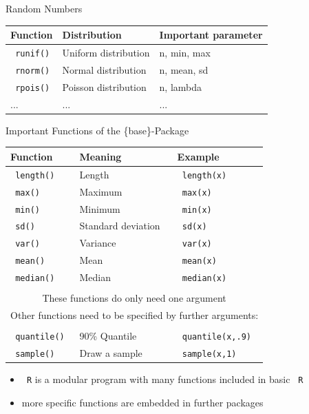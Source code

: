\documentclass[11pt,german,hideothersubsections]{beamer}
\newcommand{\R}[1]{{\tt \color{blue}  #1}}
\begin{document}
\begin{frame}[fragile]{Random Numbers}
\begin{center}
\begin{tabular}{l|l|l}
\textbf{Function } & \textbf{Distribution} & \textbf{Important parameter} \\
\hline
\hline
\R{runif()} & Uniform distribution & n, min, max\\
\hline
\R{rnorm()} & Normal distribution & n, mean, sd \\
\hline
\R{rpois()} & Poisson distribution & n, lambda\\
\hline 
... & ... & ... \\
\end{tabular}
\end{center}
\end{frame}

\begin{frame}[fragile]{Important Functions} {of the \{base\}-Package}
\begin{center}
\renewcommand{\arraystretch}{.75}
\begin{tabular}{lll}
Function & Meaning & Example \\
\hline
\R{length()} & Length & \R{length(x)}\\
\R{max()} & Maximum & \R{max(x)}\\
\R{min()} & Minimum & \R{min(x)}\\
\R{sd()} & Standard deviation & \R{sd(x)}\\
\R{var()} & Variance & \R{var(x)}\\
\R{mean()} & Mean & \R{mean(x)} \\
\R{median()} & Median & \R{median(x)} \\
&& \\
\multicolumn{3}{c}{These functions do only need one argument}\\
\multicolumn{3}{c}{Other functions need to be specified by further arguments:}\\
&& \\
\R{quantile()} & 90\% Quantile & \R{quantile(x,.9)}\\ 
\R{sample()} & Draw a sample & \R{sample(x,1)}\\
\end{tabular}
\end{center}
\begin{itemize}
\pause\item \R{R} is a modular program with many functions included in basic \R{R}
\pause\item more specific functions are embedded in further packages
\end{itemize}
\end{frame}
\end{document}
